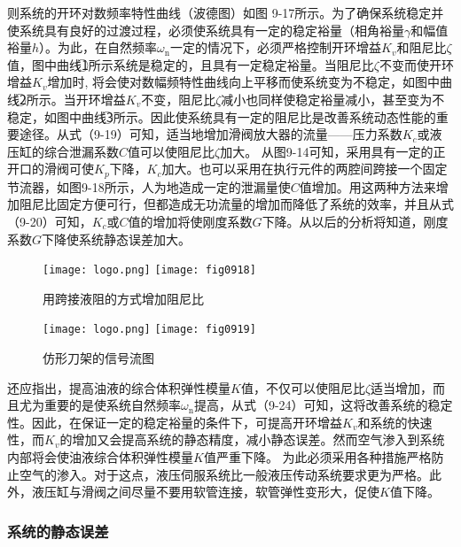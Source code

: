\noindent 则系统的开环对数频率特性曲线（波德图）如图
9-17所示。为了确保系统稳定并使系统具有良好的过渡过程，必须使系统具有一定的稳定裕量（相角裕量$\gamma $和幅值裕量$h$）。为此，在自然频率$\omega_{\text{n}}$一定的情况下，必须严格控制开环增益$K_{v}$和阻尼比$\zeta $值，图中曲线\textcircled{1}所示系统是稳定的，且具有一定稳定裕量。当阻尼比$\zeta $不变而使开环增益$K_{v}$增加时,
将会使对数幅频特性曲线向上平移而使系统变为不稳定，如图中曲线\textcircled{2}所示。当开环增益$K_{v}$不变，阻尼比$\zeta $减小也同样使稳定裕量减小，甚至变为不稳定，如图中曲线\textcircled{3}所示。因此使系统具有一定的阻尼比是改善系统动态性能的重要途径。从式（9-19）可知，适当地增加滑阀放大器的流量——压力系数$K_{c}$或液压缸的综合泄漏系数$C$值可以使阻尼比$\zeta $加大。
从图9-14可知，采用具有一定的正开口的滑阀可使$K_{p}$下降，$K_{c}$加大。也可以采用在执行元件的两腔间跨接一个固定节流器，如图9-18所示，人为地造成一定的泄漏量使$C$值增加。用这两种方法来增加阻尼比固定方便可行，但都造成无功流量的增加而降低了系统的效率，并且从式（9-20）可知，$K_{c}$或$C$值的增加将使刚度系数$G$下降。从以后的分析将知道，刚度系数$G$下降使系统静态误差加大。

\begin{figure}[!hbt]
    \centering
    \ifOpenSource
    \texttt{[image: logo.png]}
    \else
    \texttt{[image: fig0918]}
    \fi
    \caption{用跨接液阻的方式增加阻尼比}
    \label{fig:fig0918}
\end{figure}

\begin{figure}[!hbt]
    \centering
    \ifOpenSource
    \texttt{[image: logo.png]}
    \else
    \texttt{[image: fig0919]}
    \fi
    \caption{仿形刀架的信号流图}
    \label{fig:fig0919}
\end{figure}

还应指出，提高油液的综合体积弹性模量$K$值，不仅可以使阻尼比$\zeta $适当增加，而且尤为重要的是使系统自然频率$\omega_{\text{n}}$提高，从式（9-24）可知，这将改善系统的稳定性。因此，在保证一定的稳定裕量的条件下，可提高开环增益$K_{v}$和系统的快速性，而$K_{v}$的增加又会提高系统的静态精度，减小静态误差。然而空气渗入到系统内部将会使油液综合体积弹性模量$K$值严重下降。
为此必须采用各种措施严格防止空气的渗入。对于这点，液压伺服系统比一般液压传动系统要求更为严格。此外，液压缸与滑阀之间尽量不要用软管连接，软管弹性变形大，促使$K$值下降。

\subsubsection{系统的静态误差}

